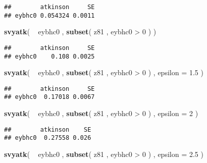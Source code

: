 \documentclass[]{book}
\newenvironment{Shaded}{\begin{snugshade}}{\end{snugshade}}
\newcommand{\KeywordTok}[1]{\textcolor[rgb]{0.13,0.29,0.53}{\textbf{{#1}}}}
\newcommand{\DataTypeTok}[1]{\textcolor[rgb]{0.13,0.29,0.53}{{#1}}}
\newcommand{\DecValTok}[1]{\textcolor[rgb]{0.00,0.00,0.81}{{#1}}}
\newcommand{\FloatTok}[1]{\textcolor[rgb]{0.00,0.00,0.81}{{#1}}}
\newcommand{\StringTok}[1]{\textcolor[rgb]{0.31,0.60,0.02}{{#1}}}
\newcommand{\NormalTok}[1]{{#1}}
\begin{document}
\begin{verbatim}
##        atkinson     SE
## eybhc0 0.054324 0.0011
\end{verbatim}

\begin{Shaded}
\begin{Highlighting}[]
\KeywordTok{svyatk}\NormalTok{( ~}\StringTok{ }\NormalTok{eybhc0 , }\KeywordTok{subset}\NormalTok{( z81 , eybhc0 >}\StringTok{ }\DecValTok{0} \NormalTok{) )}
\end{Highlighting}
\end{Shaded}

\begin{verbatim}
##        atkinson     SE
## eybhc0    0.108 0.0025
\end{verbatim}

\begin{Shaded}
\begin{Highlighting}[]
\KeywordTok{svyatk}\NormalTok{( ~}\StringTok{ }\NormalTok{eybhc0 , }\KeywordTok{subset}\NormalTok{( z81 , eybhc0 >}\StringTok{ }\DecValTok{0} \NormalTok{) , }\DataTypeTok{epsilon =} \FloatTok{1.5} \NormalTok{)}
\end{Highlighting}
\end{Shaded}

\begin{verbatim}
##        atkinson     SE
## eybhc0  0.17018 0.0067
\end{verbatim}

\begin{Shaded}
\begin{Highlighting}[]
\KeywordTok{svyatk}\NormalTok{( ~}\StringTok{ }\NormalTok{eybhc0 , }\KeywordTok{subset}\NormalTok{( z81 , eybhc0 >}\StringTok{ }\DecValTok{0} \NormalTok{) , }\DataTypeTok{epsilon =} \DecValTok{2} \NormalTok{)}
\end{Highlighting}
\end{Shaded}

\begin{verbatim}
##        atkinson    SE
## eybhc0  0.27558 0.026
\end{verbatim}

\begin{Shaded}
\begin{Highlighting}[]
\KeywordTok{svyatk}\NormalTok{( ~}\StringTok{ }\NormalTok{eybhc0 , }\KeywordTok{subset}\NormalTok{( z81 , eybhc0 >}\StringTok{ }\DecValTok{0} \NormalTok{) , }\DataTypeTok{epsilon =} \FloatTok{2.5} \NormalTok{)}
\end{Highlighting}
\end{Shaded}
\end{document}
